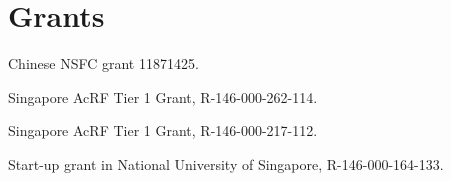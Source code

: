 \documentclass[12pt,a4paper]{article}
\newenvironment{item_list}{
 \begin{list}{}{
   \setlength{\leftmargin}{1.5em}
   \setlength{\itemsep}{0.25em}
   \setlength{\parskip}{0pt}
   \setlength{\parsep}{0.25em}
 }
}{
 \end{list}
}
\begin{document}
\section*{Grants}

\begin{item_list}
\item 
  Chinese NSFC grant 11871425.
\item
  Singapore AcRF Tier 1 Grant, R-146-000-262-114.
\item
  Singapore AcRF Tier 1 Grant, R-146-000-217-112.
\item
  Start-up grant in National University of Singapore, R-146-000-164-133.
\end{item_list}


\end{document}
